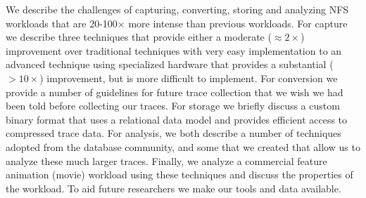 We describe the challenges of capturing, converting, storing and
analyzing NFS workloads that are 20-100$\times$ more intense than previous
workloads.  For capture we describe three techniques that provide
either a moderate ($\approx{}2\times$) improvement over traditional
techniques with very easy implementation to an advanced technique
using specialized hardware that provides a substantial ($>10\times$)
improvement, but is more difficult to implement.  For conversion we
provide a number of guidelines for future trace collection that we
wish we had been told before collecting our traces.  For storage we
briefly discuss a custom binary format that uses a relational data
model and provides efficient access to compressed trace data.  For
analysis, we both describe a number of techniques adopted from the
database community, and some that we created that allow us to analyze
these much larger traces.  Finally, we analyze a commercial feature
animation (movie) workload using these techniques and discuss the
properties of the workload.  To aid future researchers we make our
tools and data available.
